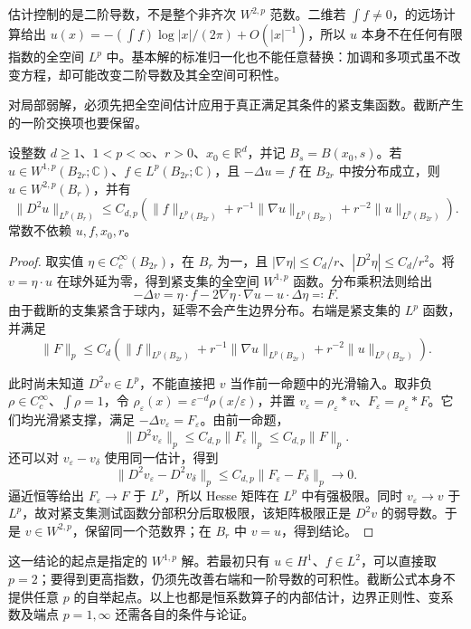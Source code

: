 \ProseParagraphBreak

估计控制的是二阶导数，不是整个非齐次 \(W^{2,p}\) 范数。二维若 \(\int f\ne0\)，的远场计算给出 \(u(x)=-(\int f)\log|x|/(2\pi)+O(|x|^{-1})\)，所以 \(u\) 本身不在任何有限指数的全空间 \(L^p\) 中。基本解的标准归一化也不能任意替换：加调和多项式虽不改变方程，却可能改变二阶导数及其全空间可积性。

\ProseParagraphBreak

对局部弱解，必须先把全空间估计应用于真正满足其条件的紧支集函数。截断产生的一阶交换项也要保留。

\begin{proposition}[内部二阶估计]\label{b2:prop:18-interior-w2p}
设整数 \(d\geq1\)、\(1<p<\infty\)、\(r>0\)、\(x_0\in\mathbb R^d\)，并记 \(B_s=B(x_0,s)\)。若 \(u\in W^{1,p}(B_{2r};\mathbb C)\)、\(f\in L^p(B_{2r};\mathbb C)\)，且 \(-\Delta u=f\) 在 \(B_{2r}\) 中按分布成立，则 \(u\in W^{2,p}(B_r)\)，并有
\[
 \|D^2u\|_{L^p(B_r)}
 \leq C_{d,p}\left(
 \|f\|_{L^p(B_{2r})}
 +r^{-1}\|\nabla u\|_{L^p(B_{2r})}
 +r^{-2}\|u\|_{L^p(B_{2r})}\right).
\]
常数不依赖 \(u,f,x_0,r\)。
\end{proposition}
\begin{proof}
取实值 \(\eta\in C_c^\infty(B_{2r})\)，在 \(B_r\) 为一，且 \(|\nabla\eta|\leq C_d/r\)、\(|D^2\eta|\leq C_d/r^2\)。将 \(v=\eta\cdot u\) 在球外延为零，得到紧支集的全空间 \(W^{1,p}\) 函数。分布乘积法则给出
\[
 -\Delta v=\eta\cdot f-2\nabla\eta\cdot\nabla u-u\cdot\Delta\eta
 \eqqcolon F.
\]
由于截断的支集紧含于球内，延零不会产生边界分布。右端是紧支集的 \(L^p\) 函数，并满足
\[
 \|F\|_p\leq C_d\left(
 \|f\|_{L^p(B_{2r})}
 +r^{-1}\|\nabla u\|_{L^p(B_{2r})}
 +r^{-2}\|u\|_{L^p(B_{2r})}\right).
\]

此时尚未知道 \(D^2v\in L^p\)，不能直接把 \(v\) 当作前一命题中的光滑输入。取非负 \(\rho\in C_c^\infty\)、\(\int\rho=1\)，令 \(\rho_\varepsilon(x)=\varepsilon^{-d}\rho(x/\varepsilon)\)，并置 \(v_\varepsilon=\rho_\varepsilon*v\)、\(F_\varepsilon=\rho_\varepsilon*F\)。它们均光滑紧支撑，满足 \(-\Delta v_\varepsilon=F_\varepsilon\)。由前一命题，
\[
 \|D^2v_\varepsilon\|_p\leq C_{d,p}\|F_\varepsilon\|_p
 \leq C_{d,p}\|F\|_p.
\]
还可以对 \(v_\varepsilon-v_\delta\) 使用同一估计，得到
\[
 \|D^2v_\varepsilon-D^2v_\delta\|_p
 \leq C_{d,p}\|F_\varepsilon-F_\delta\|_p\longrightarrow0.
\]
逼近恒等给出 \(F_\varepsilon\rightarrow F\) 于 \(L^p\)，所以 Hesse 矩阵在 \(L^p\) 中有强极限。同时 \(v_\varepsilon\rightarrow v\) 于 \(L^p\)，故对紧支集测试函数分部积分后取极限，该矩阵极限正是 \(D^2v\) 的弱导数。于是 \(v\in W^{2,p}\)，保留同一个范数界；在 \(B_r\) 中 \(v=u\)，得到结论。
\end{proof}

这一结论的起点是指定的 \(W^{1,p}\) 解。若最初只有 \(u\in H^1\)、\(f\in L^2\)，可以直接取 \(p=2\)；要得到更高指数，仍须先改善右端和一阶导数的可积性。截断公式本身不提供任意 \(p\) 的自举起点。以上也都是恒系数算子的内部估计，边界正则性、变系数及端点 \(p=1,\infty\) 还需各自的条件与论证。
